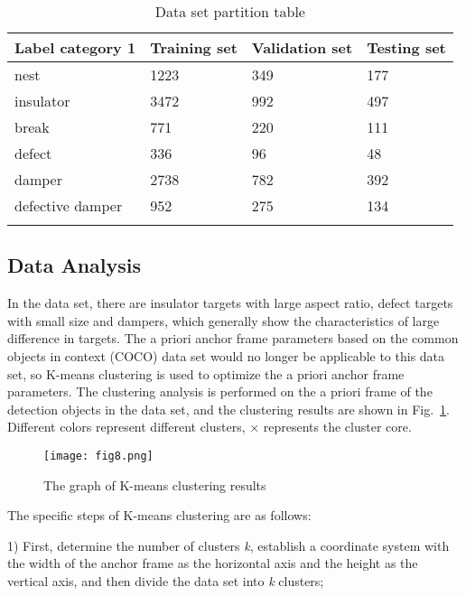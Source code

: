 \documentclass[sn-mathphys,Numbered]{sn-jnl}%
\theoremstyle{thmstyleone}%
\theoremstyle{thmstyletwo}%
\theoremstyle{thmstylethree}%
\begin{document}
\begin{table}[h]
\caption{Data set partition table}\label{tab1}%
\begin{tabular}{@{}llll@{}}
\toprule
Label category 1 & Training set  & Validation set & Testing set\\
\midrule
                nest                 & 1223	& 349   & 177  \\
                insulator            & 3472	& 992	& 497  \\
                break                & 771	& 220	& 111  \\
                defect               & 336	& 96	& 48   \\
                damper               & 2738	& 782	& 392  \\
                defective damper     & 952	& 275	& 134  \\
\botrule
\end{tabular}
\end{table}


\subsection {Data Analysis}\label {subsec2}

In the data set, there are insulator targets with large aspect ratio, defect targets with small size and dampers, which generally show the characteristics of large difference in targets. The a priori anchor frame parameters based on the common objects in context (COCO) data set would no longer be applicable to this data set, so K-means clustering is used to optimize the a priori anchor frame parameters. The clustering analysis is performed on the a priori frame of the detection objects in the data set, and the clustering results are shown in Fig.~\ref{fig8}. Different colors represent different clusters, × represents the cluster core.

\begin{figure}[h]%
\centering
\texttt{[image: fig8.png]}
\caption{The graph of K-means clustering results}\label{fig8}
\end{figure}

The specific steps of K-means clustering are as follows:

1) First, determine the number of clusters \emph{k}, establish a coordinate system with the width of the anchor frame as the horizontal axis and the height as the vertical axis, and then divide the data set into \emph{k} clusters;
\end{document}
